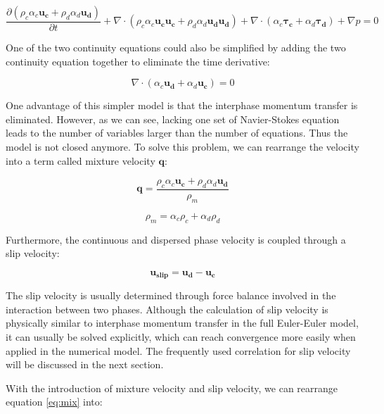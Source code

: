 \begin{equation}\label{eq:mix}
         \frac{\partial (\rho_c\alpha_c\mathbf{u_c}+\rho_d\alpha_d\mathbf{u_d})}{\partial t}  
        +  \nabla \cdot (\rho_c \alpha _c \mathbf{u_c u_c} + \rho_d \alpha _d \mathbf{u_d u_d})  + \nabla \cdot (\alpha_c \mathbf{τ_c} + \alpha_d \mathbf{τ_d}) + \nabla p
        = 0
\end{equation}

One of the two continuity equations could also be simplified by adding the two continuity equation together to eliminate the time derivative:

\begin{equation}
    \nabla \cdot (\alpha_c \mathbf{u_d}+\alpha_d \mathbf{u_c})=0
\end{equation}

One advantage of this simpler model is that the interphase momentum transfer is eliminated. However, as we can see, lacking one set of Navier-Stokes equation leads to the number of variables larger than the number of equations. Thus the model is not closed anymore. To solve this problem, we can rearrange the velocity into a term called mixture velocity $\mathbf{q}$:

\begin{equation}
    \mathbf{q}= \frac{\rho_c\alpha_c\mathbf{u_c}+\rho_d\alpha_d\mathbf{u_d}}{\rho_m}
\end{equation}

\begin{equation}
    \rho_m = \alpha_c \rho_c + \alpha_d \rho_d
\end{equation}

Furthermore, the continuous and dispersed phase velocity is coupled through a slip velocity:

\begin{equation}
    \mathbf{u_{slip}}=\mathbf{u_d} - \mathbf{u_c}
\end{equation}

The slip velocity is usually determined through force balance involved in the interaction between two phases. Although the calculation of slip velocity is physically similar to interphase momentum transfer in the full Euler-Euler model, it can usually be solved explicitly, which can reach convergence more easily when applied in the numerical model. The frequently used correlation for slip velocity will be discussed in the next section.

With the introduction of mixture velocity and slip velocity, we can rearrange equation \ref{eq:mix} into:

